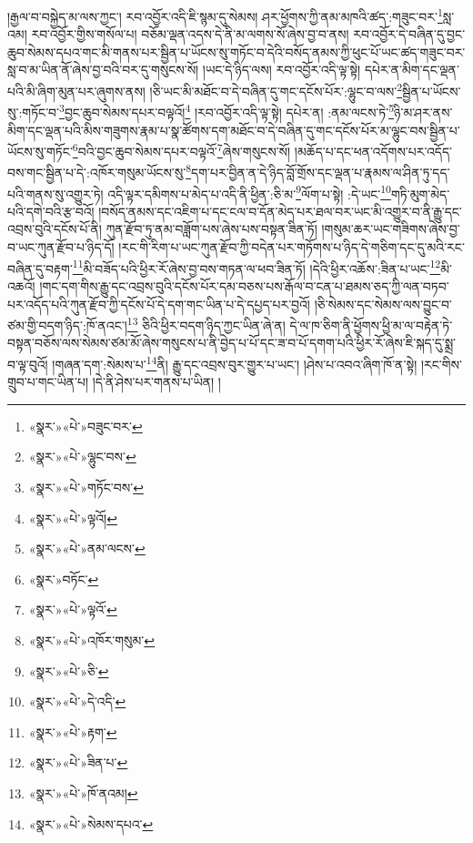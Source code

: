།རྒྱལ་བ་བསྐྱེད་མ་ལས་ཀྱང་། རབ་འབྱོར་འདི་ཇི་སྙམ་དུ་སེམས། ཤར་ཕྱོགས་ཀྱི་ནམ་མཁའི་ཚད་:གཟུང་བར་\footnote{«སྣར་»«པེ་»བཟུང་བར་}སླ་འམ། རབ་འབྱོར་གྱིས་གསོལ་པ། བཅོམ་ལྡན་འདས་དེ་ནི་མ་ལགས་སོ་ཞེས་བྱ་བ་ནས། རབ་འབྱོར་དེ་བཞིན་དུ་བྱང་ཆུབ་སེམས་དཔའ་གང་མི་གནས་པར་སྦྱིན་པ་ཡོངས་སུ་གཏོང་བ་དེའི་བསོད་ནམས་ཀྱི་ཕུང་པོ་ཡང་ཚད་གཟུང་བར་སླ་བ་མ་ཡིན་ནོ་ཞེས་བྱ་བའི་བར་དུ་གསུངས་སོ། །ཡང་དེ་ཉིད་ལས། རབ་འབྱོར་འདི་ལྟ་སྟེ། དཔེར་ན་མིག་དང་ལྡན་པའི་མི་ཞིག་མུན་པར་ཞུགས་ནས། །ཅི་ཡང་མི་མཐོང་བ་དེ་བཞིན་དུ་གང་དངོས་པོར་:ལྷུང་བ་ལས་\footnote{«སྣར་»«པེ་»ལྷུང་བས་}སྦྱིན་པ་ཡོངས་སུ་:གཏོང་བ་\footnote{«སྣར་»«པེ་»གཏོང་བས་}བྱང་ཆུབ་སེམས་དཔར་བལྟའོ།\footnote{«སྣར་»«པེ་»ལྟའོ།} །རབ་འབྱོར་འདི་ལྟ་སྟེ། དཔེར་ན། :ནམ་ལངས་ཏེ་\footnote{«སྣར་»«པེ་»ནམ་ལངས་}ཉི་མ་ཤར་ནས་མིག་དང་ལྡན་པའི་མིས་གཟུགས་རྣམ་པ་སྣ་ཚོགས་དག་མཐོང་བ་དེ་བཞིན་དུ་གང་དངོས་པོར་མ་ལྷུང་བས་སྦྱིན་པ་ཡོངས་སུ་གཏོང་\footnote{«སྣར་»བཏོང་}བའི་བྱང་ཆུབ་སེམས་དཔར་བལྟའོ་\footnote{«སྣར་»«པེ་»ལྟའོ་}ཞེས་གསུངས་སོ། །མཆོད་པ་དང་ཕན་འདོགས་པར་འདོད་བས་གང་སྦྱིན་པ་དེ་:འཁོར་གསུམ་ཡོངས་སུ་\footnote{«སྣར་»«པེ་»འཁོར་གསུམ་}དག་པར་བྱིན་ན་དེ་ཉིད་བློ་གྲོས་དང་ལྡན་པ་རྣམས་ལ་ཤིན་ཏུ་དད་པའི་གནས་སུ་འགྱུར་ཏེ། འདི་ལྟར་དམིགས་པ་མེད་པ་འདི་ནི་ཕྱིན་:ཅི་མ་\footnote{«སྣར་»«པེ་»ཅི་}ལོག་པ་སྟེ། :དེ་ཡང་\footnote{«སྣར་»«པེ་»དེ་འདི་}གཏི་མུག་མེད་པའི་དགེ་བའི་རྩ་བའོ། །བསོད་ནམས་དང་འཇིག་པ་དང་ངལ་བ་དོན་མེད་པར་ཐལ་བར་ཡང་མི་འགྱུར་བ་ནི་རྒྱུ་དང་འབྲས་བུའི་དངོས་པོ་ནི། ཀུན་རྫོབ་ཏུ་ནམ་བཟློག་པས་ཞེས་པས་བསྟན་ཟིན་ཏོ། །གསུམ་ཆར་ཡང་གཟིགས་ཞེས་བྱ་བ་ཡང་ཀུན་རྫོབ་པ་ཉིད་དོ། །རང་གི་རིག་པ་ཡང་ཀུན་རྫོབ་ཀྱི་བདེན་པར་གཏོགས་པ་ཉིད་དེ་གཅིག་དང་དུ་མའི་རང་བཞིན་དུ་བརྟག་\footnote{«སྣར་»«པེ་»རྟག་}མི་བཟོད་པའི་ཕྱིར་རོ་ཞེས་བྱ་བས་གཏན་ལ་ཕབ་ཟིན་ཏོ། །དེའི་ཕྱིར་འཆོས་:ཟིན་པ་ཡང་\footnote{«སྣར་»«པེ་»ཟིན་པ་}མི་འཆའོ། །གང་དག་གིས་རྒྱུ་དང་འབྲས་བུའི་དངོས་པོར་དམ་བཅས་པས་རྒོལ་བ་ངན་པ་ཐམས་ཅད་ཀྱི་ལན་བཏབ་པར་འདོད་པའི་ཀུན་རྫོབ་ཀྱི་དངོས་པོ་དེ་དག་གང་ཡིན་པ་དེ་དཔྱད་པར་བྱའོ། །ཅི་སེམས་དང་སེམས་ལས་བྱུང་བ་ཙམ་གྱི་བདག་ཉིད་:ཁོ་ནའང་།\footnote{«སྣར་»«པེ་»ཁོ་ནའམ།} ཅིའི་ཕྱིར་བདག་ཉིད་ཀྱང་ཡིན་ཞེ་ན། དེ་ལ་ཁ་ཅིག་ནི་ཕྱོགས་ཕྱི་མ་ལ་བརྟེན་ཏེ་བསྟན་བཅོས་ལས་སེམས་ཙམ་མོ་ཞེས་གསུངས་པ་ནི་བྱེད་པ་པོ་དང་ཟ་བ་པོ་དགག་པའི་ཕྱིར་རོ་ཞེས་ཇི་སྐད་དུ་སྨྲ་བ་ལྟ་བུའོ། །གཞན་དག་:སེམས་པ་\footnote{«སྣར་»«པེ་»སེམས་དཔའ་}ནི། རྒྱུ་དང་འབྲས་བུར་གྱུར་པ་ཡང་། །ཤེས་པ་འབའ་ཞིག་ཁོ་ན་སྟེ། །རང་གིས་གྲུབ་པ་གང་ཡིན་པ། །དེ་ནི་ཤེས་པར་གནས་པ་ཡིན། །
